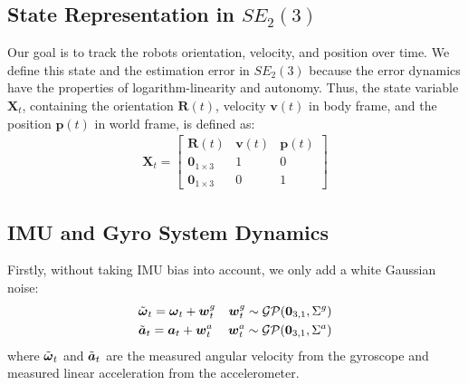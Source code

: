 \subsection{State Representation in $SE_2(3)$}
Our goal is to track the robots orientation, velocity, and position over time. We define this state and the estimation error in $SE_2(3)$ because the error dynamics have the properties of logarithm-linearity and autonomy. Thus, the state variable $\mathbf{X}_t$, containing the orientation $\mathbf{R}(t)$, velocity $\mathbf{v}(t)$ in body frame, and the position $\mathbf{p}(t)$ in world frame, is defined as:
\begin{gather*}
    \mathbf{X}_t =
    \begin{bmatrix}
        \mathbf{R}(t) & \mathbf{v}(t) & \mathbf{p}(t) \\
        \mathbf{0}_{1 \times 3} & 1 & 0 \\
        \mathbf{0}_{1 \times 3} & 0 & 1
    \end{bmatrix}
\end{gather*}

\subsection{IMU and Gyro System Dynamics}
Firstly, without taking IMU bias into account, we only add a white Gaussian noise:
\begin{align}
    & \tilde{\boldsymbol{\omega}}_t = \boldsymbol{\omega}_t + \boldsymbol{w}^g_t 
    & \boldsymbol{w}^g_t \sim \mathcal{GP}(\boldsymbol{0}_{3,1},\Sigma^g)\\
    & \tilde{\boldsymbol{a}}_t = \boldsymbol{a}_t + \boldsymbol{w}^a_t
    & \boldsymbol{w}^a_t \sim \mathcal{GP}(\boldsymbol{0}_{3,1},\Sigma^a)
\end{align}
where $\tilde{\boldsymbol{\omega}}_t$ and $\tilde{\boldsymbol{a}}_t$ are the measured angular velocity from the gyroscope and measured linear acceleration from the accelerometer.

